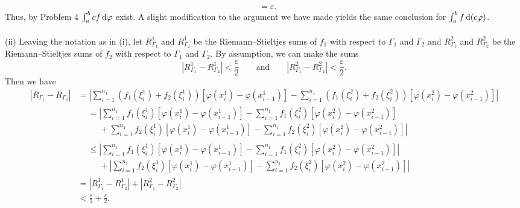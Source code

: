 \begin{solution}
\begin{align*}
    &=\varepsilon.
  \end{align*}
  Thus, by Problem 4 $\int_a^b cf\mathop{}\!\mathrm{d}\varphi$ exist. A slight modification
  to the argument we have made yields the same conclusion for
  $\int_a^b f\mathop{}\!\mathrm{d}(c\varphi)$.
  \\\\
  (ii) Leaving the notation as in (i), let $R_{\Gamma_1}^1$ and
  $R_{\Gamma_2}^1$ be the Riemann--Stieltjes sums of $f_1$ with respect to
  $\Gamma_1$ and $\Gamma_2$ and $R_{\Gamma_1}^2$ and $R_{\Gamma_2}^2$ be
  the Riemann--Stieltjes sums of $f_2$ with respect to $\Gamma_1$ and
  $\Gamma_2$. By assumption, we can make the sums
  \[
    |R_{\Gamma_1}^1-R_{\Gamma_2}^1|<\frac{\varepsilon}{2}
    \qquad\text{and}\qquad
    |R_{\Gamma_1}^2-R_{\Gamma_2}^2|<\frac{\varepsilon}{2}.
  \]
  Then we have
  \begin{align*}
    |R_{\Gamma_1}-R_{\Gamma_2}|
    &{}={}\left|
      \sum_{i=1}^{n_1}(f_1(\xi_i^1)+f_2(\xi_i^1))
      \left[\varphi(x_i^1)-\varphi(x_{i-1}^1)\right]
      -\sum_{i=1}^{n_1}(f_1(\xi_i^2)+f_2(\xi_i^2))
      \left[\varphi(x_i^2)-\varphi(x_{i-1}^2)\right]
      \right|\\
    {}&{}\begin{aligned}
      &=\left|\sum_{i=1}^{n_1}f_1(\xi_i^1)
        \left[\varphi(x_i^1)-\varphi(x_{i-1}^1)\right]
        -\sum_{i=1}^{n_1}f_1(\xi_i^2)
        \left[\varphi(x_i^2)-\varphi(x_{i-1}^2)
        \right]\right.\\
      &\phantom{{}={}}+\left. \sum_{i=1}^{n_1}f_2(\xi_i^1)
        \left[\varphi(x_i^1)-\varphi(x_{i-1}^1)\right]
        -\sum_{i=1}^{n_1}f_2(\xi_i^2)
        \left[\varphi(x_i^2)-\varphi(x_{i-1}^2) \right] \right|
    \end{aligned}\\
    &\begin{aligned}
      &\leq\left|\sum_{i=1}^{n_1}f_1(\xi_i^1)
        \left[\varphi(x_i^1)-\varphi(x_{i-1}^1)\right]
        -\sum_{i=1}^{n_1}f_1(\xi_i^2)
        \left[\varphi(x_i^2)-\varphi(x_{i-1}^2)
        \right]\right|\\
      &\phantom{{}={}}+\left|\sum_{i=1}^{n_1}f_2(\xi_i^1)
        \left[\varphi(x_i^1)-\varphi(x_{i-1}^1)\right]
        -\sum_{i=1}^{n_1}f_2(\xi_i^2)
        \left[\varphi(x_i^2)-\varphi(x_{i-1}^2) \right] \right|
    \end{aligned}\\
    &{}={}|R_{\Gamma_1}^1-R_{\Gamma_2}^1|+|R_{\Gamma_1}^2-R_{\Gamma_2}^2|\\
    &{}<{}\frac{\varepsilon}{2}+\frac{\varepsilon}{2}.

\end{align*}
\end{solution}
